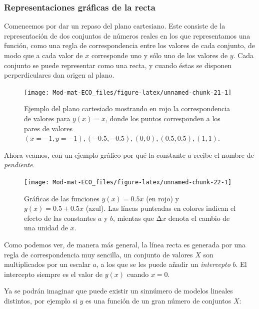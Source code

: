 \documentclass[
]{book}
\begin{document}
\hypertarget{representaciones-gruxe1ficas-de-la-recta}{%
\subsubsection{Representaciones gráficas de la recta}\label{representaciones-gruxe1ficas-de-la-recta}}

Comencemos por dar un repaso del plano cartesiano. Este consiste de la representación de dos conjuntos de números reales en los que representamos una función, como una regla de correspondencia entre los valores de cada conjunto, de modo que a cada valor de \(x\) corresponde uno y sólo uno de los valores de \(y\). Cada conjunto se puede representar como una recta, y cuando éstas se disponen perperdiculares dan origen al plano.

\begin{figure}

{\centering \texttt{[image: Mod-mat-ECO\_files/figure-latex/unnamed-chunk-21-1]} 

}

\caption{Ejemplo del plano cartesiado mostrando en rojo la correspondencia de valores para $y(x) = x$, donde los puntos corresponden a los pares de valores $(x = -1, y = -1), (-0.5, -0.5), (0, 0), (0.5, 0.5), (1, 1)$.}\label{fig:unnamed-chunk-21}
\end{figure}

Ahora veamos, con un ejemplo gráfico por qué la constante \(a\) recibe el nombre de \emph{pendiente}.

\begin{figure}

{\centering \texttt{[image: Mod-mat-ECO\_files/figure-latex/unnamed-chunk-22-1]} 

}

\caption{Gráficas de las funciones $y(x) = 0.5 x$ (en rojo) y $y(x) = 0.5 + 0.5 x$ (azul). Las líneas punteadas en colores indican el efecto de las constantes $a$ y $b$, mientas que Δ$x$ denota el cambio de una unidad de $x$.}\label{fig:unnamed-chunk-22}
\end{figure}

Como podemos ver, de manera más general, la línea recta es generada por una regla de correspondencia muy sencilla, un conjunto de valores \(X\) son multiplicados por un escalar \(a\), a los que se les puede añadir un \emph{intercepto} \(b\). El intercepto siempre es el valor de \(y(x)\) cuando \(x = 0\).

Ya se podrán imaginar que puede existir un sinnúmero de modelos lineales distintos, por ejemplo si \(y\) es una función de un gran número de conjuntos \(X\):
\end{document}
